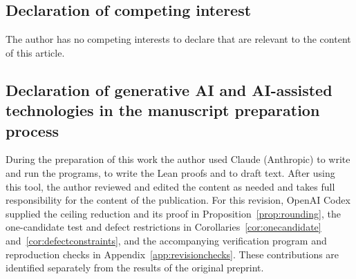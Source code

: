 \documentclass[screen,reqno]{aomart}
\numberwithin{equation}{section}
\theoremstyle{plain}
\theoremstyle{definition}
\theoremstyle{remark}
\begin{document}
\subsection*{Declaration of competing interest}
The author has no competing interests to declare that are relevant to
the content of this article.

\subsection*{Declaration of generative AI and AI-assisted technologies in the manuscript preparation process}
During the preparation of this work the author used Claude (Anthropic)
to write and run the programs, to write the Lean proofs and to draft
text. After using this tool, the author reviewed and edited the content
as needed and takes full responsibility for the content of the
publication. For this revision, OpenAI Codex supplied the ceiling
reduction and its proof in Proposition~\ref{prop:rounding}, the
one-candidate test and defect restrictions in
Corollaries~\ref{cor:onecandidate} and~\ref{cor:defectconstraints},
and the accompanying verification program and reproduction checks in
Appendix~\ref{app:revisionchecks}. These contributions are identified
separately from the results of the original preprint.
\end{document}
